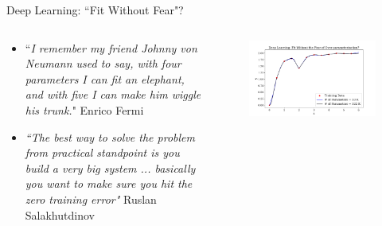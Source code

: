 \documentclass[aspectratio=169,10pt]{beamer}
\begin{document}
\begin{frame}{Deep Learning: ``Fit Without Fear"?}
	\begin{columns}
		\begin{column}{0.4\textwidth}
			\begin{itemize}
				\item ``{\it I remember my friend Johnny von Neumann used to say, with four parameters I can fit an elephant, and with five I can make him wiggle his trunk.}" \hfill Enrico Fermi
				\vspace{0.15in}
				\item {\it ``The best way to solve the problem from practical standpoint is you build a very big system ... basically you want to make sure you hit the zero training error" } \hfil Ruslan Salakhutdinov
			\end{itemize}
		\end{column}
		\begin{column}{0.6\textwidth}
			\begin{figure}[t!]
				\centering
				\includegraphics[width=\textwidth]{figs/smooth_interpolation_33_vs_322.pdf}
				\vspace{-7mm}
			\end{figure}
		\end{column}
	\end{columns}
\end{frame}
\end{document}
